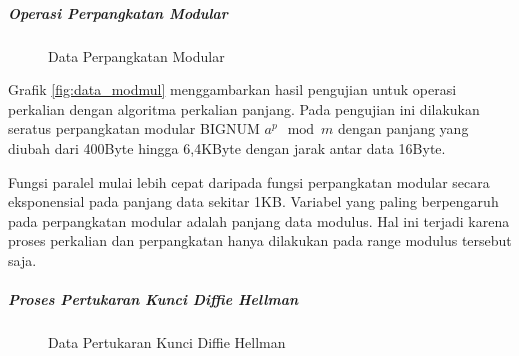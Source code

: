     \subparagraph{Operasi Perpangkatan Modular}
    \begin{figure}[h]
      \centering
      \caption{Data Perpangkatan Modular}
      \label{fig:data_modexp}
    \end{figure}

    Grafik \ref{fig:data_modmul} menggambarkan hasil pengujian untuk operasi perkalian dengan algoritma perkalian panjang. Pada pengujian ini dilakukan seratus perpangkatan modular BIGNUM $a^p \mod m$ dengan panjang yang diubah dari 400Byte hingga 6,4KByte dengan jarak antar data 16Byte.

    Fungsi paralel mulai lebih cepat daripada fungsi perpangkatan modular secara eksponensial pada panjang data sekitar 1KB. Variabel yang paling berpengaruh pada perpangkatan modular adalah panjang data modulus. Hal ini terjadi karena proses perkalian dan perpangkatan hanya dilakukan pada range modulus tersebut saja.

      \subparagraph{Proses Pertukaran Kunci Diffie Hellman}
      \begin{figure}[h]
        \centering
        \caption{Data Pertukaran Kunci Diffie Hellman}
        \label{fig:data_dh}
      \end{figure}

